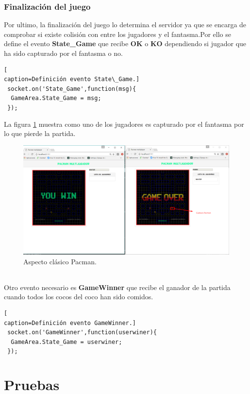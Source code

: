 \subsubsection*{Finalización del juego}
Por ultimo, la finalización del juego lo determina el servidor ya que se encarga de comprobar si existe colisión con entre los jugadores y el fantasma.Por ello se define el evento \textbf{State\_Game} que recibe \textbf{OK} o \textbf{KO} dependiendo si jugador que ha sido capturado por el fantasma o no.
\begin{lstlisting}[
caption=Definición evento State\_Game.]
 socket.on('State_Game',function(msg){
  GameArea.State_Game = msg;
 });
\end{lstlisting}
La figura \ref{fig:Captura_Pacman} muestra como uno de los jugadores es capturado por el fantasma por lo que pierde la partida.
\begin{figure}[!h]
\begin{center}
   \includegraphics[width=0.6\linewidth]{Figures/Captura_Pacman}
	\decoRule
	\caption[Aspecto clásico Pacman]{Aspecto clásico Pacman.}
\label{fig:Captura_Pacman}
\end{center}
\end{figure}
\\Otro evento necesario es \textbf{GameWinner} que recibe el ganador de la partida cuando todos los cocos del coco han sido comidos.
\begin{lstlisting}[
caption=Definición evento GameWinner.]
 socket.on('GameWinner',function(userwiner){
  GameArea.State_Game = userwiner;
 });
\end{lstlisting}
\section{Pruebas}